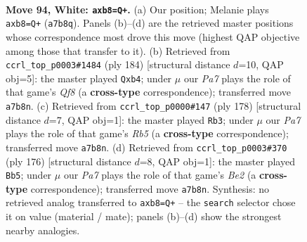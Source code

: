 \documentclass[11pt]{article}
\begin{document}
\clearpage

\begin{figure}[p]\centering
\begin{subfigure}{0.46\textwidth}\centering
\resizebox{\linewidth}{!}{%
\newchessgame
\chessboard[
  setfen={1r4k1/P7/8/8/8/6K1/8/8 w - - 0 94},
  showmover=false,
  pgfstyle=straightmove, color=movearrow, markmove={a7-b8}
]}
\caption{}
\end{subfigure}\hfill
\begin{subfigure}{0.46\textwidth}\centering
\resizebox{\linewidth}{!}{%
\newchessgame
\chessboard[
  setfen={5Q2/8/8/3k2K1/1r6/8/8/8 w - - 2 93},
  showmover=false,
  pgfstyle=straightmove, color=movearrow, markmove={f8-b4}
]}
\caption{}
\end{subfigure}
\\[4pt]
\begin{subfigure}{0.46\textwidth}\centering
\resizebox{\linewidth}{!}{%
\newchessgame
\chessboard[
  setfen={2k5/8/8/1R6/2r5/8/4K3/8 w - - 10 90},
  showmover=false,
  pgfstyle=straightmove, color=movearrow, markmove={b5-b3}
]}
\caption{}
\end{subfigure}\hfill
\begin{subfigure}{0.46\textwidth}\centering
\resizebox{\linewidth}{!}{%
\newchessgame
\chessboard[
  setfen={8/8/8/8/3r1k2/8/4B1K1/8 w - - 15 89},
  showmover=false,
  pgfstyle=straightmove, color=movearrow, markmove={e2-b5}
]}
\caption{}
\end{subfigure}
\caption{\textbf{Move 94, White: \texttt{axb8=Q+}.} (a) Our position; Melanie plays \texttt{axb8=Q+} (\texttt{a7b8q}). Panels (b)--(d) are the retrieved master positions whose correspondence most drove this move (highest QAP objective among those that transfer to it). (b) Retrieved from \texttt{ccrl\_top\_p0003\#1484} (ply 184) [structural distance $d$=10, QAP obj=5]: the master played \texttt{Qxb4}; under $\mu$ our \emph{Pa7} plays the role of that game's \emph{Qf8} (a \textbf{cross-type} correspondence); transferred move \texttt{a7b8n}. (c) Retrieved from \texttt{ccrl\_top\_p0000\#147} (ply 178) [structural distance $d$=7, QAP obj=1]: the master played \texttt{Rb3}; under $\mu$ our \emph{Pa7} plays the role of that game's \emph{Rb5} (a \textbf{cross-type} correspondence); transferred move \texttt{a7b8n}. (d) Retrieved from \texttt{ccrl\_top\_p0003\#370} (ply 176) [structural distance $d$=8, QAP obj=1]: the master played \texttt{Bb5}; under $\mu$ our \emph{Pa7} plays the role of that game's \emph{Be2} (a \textbf{cross-type} correspondence); transferred move \texttt{a7b8n}. Synthesis: no retrieved analog transferred to \texttt{axb8=Q+} -- the \texttt{search} selector chose it on value (material / mate); panels (b)--(d) show the strongest nearby analogies.}
\label{fig:thought-m186}
\end{figure}
\end{document}
